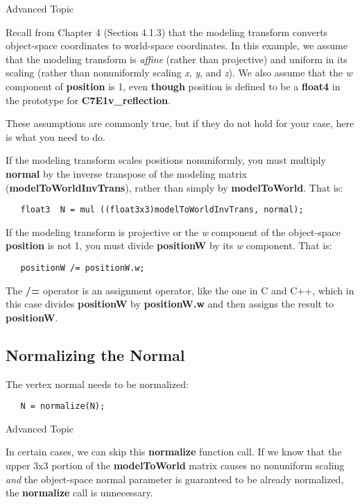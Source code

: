 \documentclass[../main.tex]{subfiles}
\begin{document}
\begin{framed}
Advanced Topic

Recall from Chapter 4 (Section 4.1.3) that the modeling transform converts object-space coordinates to world-space coordinates. In this example, we assume that the modeling transform is \textit{affine} (rather than projective) and uniform in its scaling (rather than nonuniformly scaling \textit{x}, \textit{y}, and \textit{z}). We also assume that the \textit{w} component of \textbf{position} is 1, even \textbf{though} position is defined to be a \textbf{float4} in the prototype for \textbf{C7E1v_reflection}.

These assumptions are commonly true, but if they do not hold for your case, here is what you need to do.

If the modeling transform scales positions nonuniformly, you must multiply \textbf{normal} by the inverse transpose of the modeling matrix (\textbf{modelToWorldInvTrans}), rather than simply by \textbf{modelToWorld}. That is:

\FloatBarrier
\begin{lstlisting}
   float3  N = mul ((float3x3)modelToWorldInvTrans, normal);
\end{lstlisting}
\FloatBarrier
   
If the modeling transform is projective or the \textit{w} component of the object-space \textbf{position} is not 1, you must divide \textbf{positionW} by its \textit{w} component. That is:

\FloatBarrier
\begin{lstlisting}
   positionW /= positionW.w;
\end{lstlisting}
\FloatBarrier

The \textbf{/=} operator is an assignment operator, like the one in C and C++, which in this case divides \textbf{positionW} by \textbf{positionW.w} and then assigns the result to \textbf{positionW}.
\end{framed}

\subsection*{Normalizing the Normal}

The vertex normal needs to be normalized:

\FloatBarrier
\begin{lstlisting}
   N = normalize(N);
\end{lstlisting}
\FloatBarrier

\begin{framed}
Advanced Topic

In certain cases, we can skip this \textbf{normalize} function call. If we know that the upper 3x3 portion of the \textbf{modelToWorld} matrix causes no nonuniform scaling \textit{and} the object-space normal parameter is guaranteed to be already normalized, the \textbf{normalize} call is unnecessary.
\end{framed}
\end{document}
